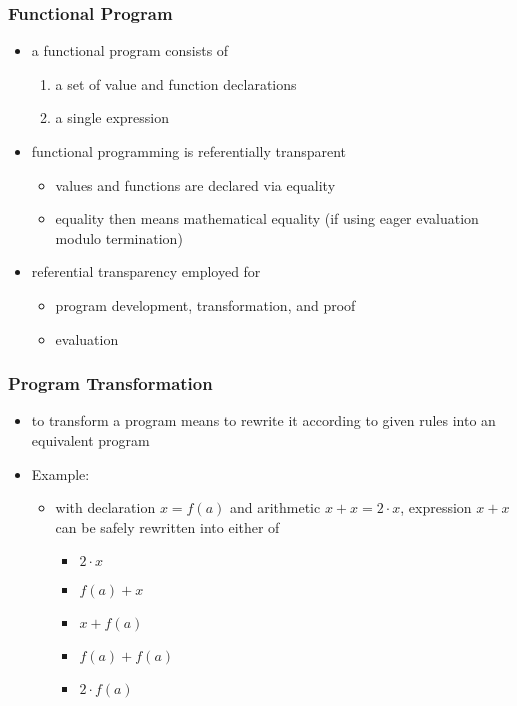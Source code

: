 \begin{multicols}{2}
\subsubsection{Functional Program}
\begin{itemize}
  \item a functional program consists of
  \begin{enumerate}
    \item a set of value and function declarations
    \item a single expression
  \end{enumerate}
  \item functional programming is referentially transparent
  \begin{itemize}
    \item values and functions are declared via equality
    \item equality then means mathematical equality (if using eager evaluation modulo termination)
  \end{itemize}
  \item referential transparency employed for
  \begin{itemize}
    \item program development, transformation, and proof
    \item evaluation
  \end{itemize}
\end{itemize}

\subsubsection{Program Transformation}
\begin{itemize}
  \item to transform a program means to rewrite it according to given rules into an equivalent program
  \item Example:
  \begin{itemize}
    \item with declaration $x = f(a)$ and arithmetic $x + x = 2 \cdot x$, expression $x + x$ can be safely rewritten into either of
    \begin{itemize}
      \item $2 \cdot x$
      \item $f(a) + x$
      \item $x + f(a)$
      \item $f(a) + f(a)$
      \item $2 \cdot f(a)$
    \end{itemize}
  \end{itemize}
\end{itemize}


\end{multicols}
